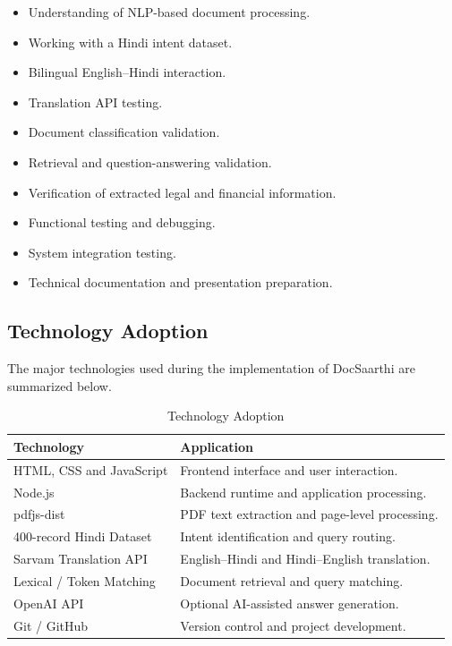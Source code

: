 \begin{itemize}

    \item Understanding of NLP-based document processing.

    \item Working with a Hindi intent dataset.

    \item Bilingual English--Hindi interaction.

    \item Translation API testing.

    \item Document classification validation.

    \item Retrieval and question-answering validation.

    \item Verification of extracted legal and financial information.

    \item Functional testing and debugging.

    \item System integration testing.

    \item Technical documentation and presentation preparation.

\end{itemize}

\subsection{Technology Adoption}

The major technologies used during the implementation of DocSaarthi
are summarized below.

\begin{table}[H]
\centering
\caption{Technology Adoption}
\label{tab:technology_adoption}

\renewcommand{\arraystretch}{1.2}

\begin{tabular}{|p{4cm}|p{9cm}|}
\hline
\textbf{Technology} & \textbf{Application}
\\
\hline
HTML, CSS and JavaScript &
Frontend interface and user interaction.
\\
\hline
Node.js &
Backend runtime and application processing.
\\
\hline
pdfjs-dist &
PDF text extraction and page-level processing.
\\
\hline
400-record Hindi Dataset &
Intent identification and query routing.
\\
\hline
Sarvam Translation API &
English--Hindi and Hindi--English translation.
\\
\hline
Lexical / Token Matching &
Document retrieval and query matching.
\\
\hline
OpenAI API &
Optional AI-assisted answer generation.
\\
\hline
Git / GitHub &
Version control and project development.
\\
\hline
\end{tabular}
\end{table}

